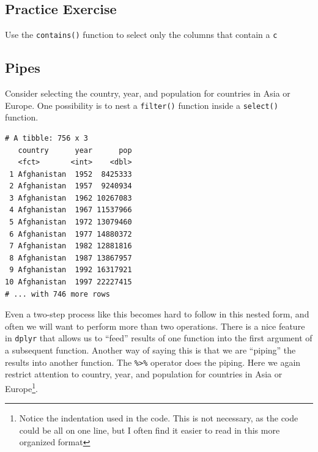 \documentclass[]{krantz}
\makeatletter
\newenvironment{Shaded}{\begin{snugshade}}{\end{snugshade}}
\newcommand{\KeywordTok}[1]{\textcolor[rgb]{0.27,0.27,0.27}{\textbf{#1}}}
\newcommand{\StringTok}[1]{\textcolor[rgb]{0.5,0.5,0.5}{#1}}
\newcommand{\OperatorTok}[1]{\textcolor[rgb]{0.43,0.43,0.43}{\textbf{#1}}}
\newcommand{\NormalTok}[1]{#1}
\newenvironment{kframe}{%
\medskip{}
\setlength{\fboxsep}{.8em}
 \def\at@end@of@kframe{}%
 \ifinner\ifhmode%
  \def\at@end@of@kframe{\end{minipage}}%
  \begin{minipage}{\columnwidth}%
 \fi\fi%
 \def\FrameCommand##1{\hskip\@totalleftmargin \hskip-\fboxsep
 \colorbox{shadecolor}{##1}\hskip-\fboxsep
     \hskip-\linewidth \hskip-\@totalleftmargin \hskip\columnwidth}%
 \MakeFramed {\advance\hsize-\width
   \@totalleftmargin\z@ \linewidth\hsize
   \@setminipage}}%
 {\par\unskip\endMakeFramed%
 \at@end@of@kframe}
\renewenvironment{Shaded}{\begin{kframe}}{\end{kframe}}
\makeatother
\begin{document}
\subsection{Practice Exercise}\label{practice-exercise-8}

Use the \texttt{contains()} function to select only the columns that
contain a \texttt{c}

\subsection{Pipes}\label{pipes}

Consider selecting the country, year, and population for countries in
Asia or Europe. One possibility is to nest a \texttt{filter()} function
inside a \texttt{select()} function.

\begin{Shaded}
\end{Shaded}

\begin{verbatim}
# A tibble: 756 x 3
   country      year      pop
   <fct>       <int>    <dbl>
 1 Afghanistan  1952  8425333
 2 Afghanistan  1957  9240934
 3 Afghanistan  1962 10267083
 4 Afghanistan  1967 11537966
 5 Afghanistan  1972 13079460
 6 Afghanistan  1977 14880372
 7 Afghanistan  1982 12881816
 8 Afghanistan  1987 13867957
 9 Afghanistan  1992 16317921
10 Afghanistan  1997 22227415
# ... with 746 more rows
\end{verbatim}

Even a two-step process like this becomes hard to follow in this nested
form, and often we will want to perform more than two operations. There
is a nice feature in \texttt{dplyr} that allows us to ``feed'' results
of one function into the first argument of a subsequent function.
Another way of saying this is that we are ``piping'' the results into
another function. The \texttt{\%\textgreater{}\%} operator does the
piping. Here we again restrict attention to country, year, and
population for countries in Asia or Europe\footnote{Notice the
  indentation used in the code. This is not necessary, as the code could
  be all on one line, but I often find it easier to read in this more
  organized format}.
\end{document}
